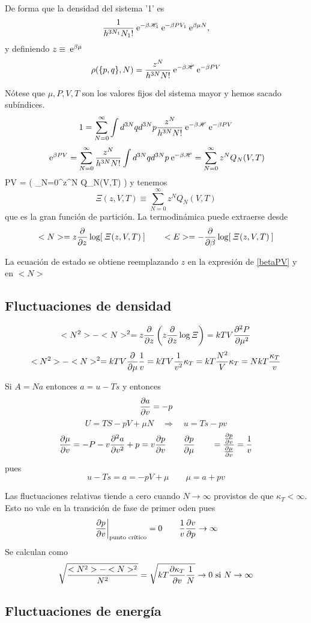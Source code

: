 \documentclass[10pt,oneside]{CBFT_book}
\begin{document}
De forma que la densidad del sistema '1' es
\[
	\frac{1}{h^{3N_1}N_1!} \euler^{-\beta\Ham_1}  \euler^{-\beta PV_1}  \euler^{\beta \mu N},
\]
y definiendo $z \equiv \euler^{\beta\mu}$
\[
	\rho(\{p,q\},N) = \frac{z^N}{h^{3N}N!} \euler^{-\beta\Ham}  \euler^{-\beta PV} 
\]

Nótese que $ \mu, P, V, T$  son los valores fijos del sistema mayor y hemos sacado subíndices.
\[
	1 = \sum_{N=0}^\infty \int d^{3N}q d^{3N}p \frac{z^N}{h^{3N}N!} \euler^{-\beta\Ham}  \euler^{-\beta PV} 
\]
\[
	\euler^{\beta PV} = \sum_{N=0}^\infty \frac{z^N}{h^{3N}N!} \int d^{3N}q d^{3N}p \euler^{-\beta\Ham}
	= \sum_{N=0}^\infty z^N Q_N(V,T)
\]
\be
	\beta PV = \log \left( \sum_{N=0}^\infty z^N Q_N(V,T) \right)
	\label{betaPV}
\ee
y tenemos 
\[
	\Xi(z,V,T) \equiv \sum_{N=0}^\infty z^N Q_N(V,T)
\]
que es la gran función de partición.
La termodinámica puede extraerse desde 
\[
	<N> = z\dpar{}{z} \log [ \:\Xi(z,V,T) \:]     \qquad 
	<E> = -\dpar{}{\beta} \log [ \:\Xi(z,V,T)\: ]
\]

La ecuación de estado se obtiene reemplazando $z$ en la expresión de \eqref{betaPV} y en $<N>$


\subsection{Fluctuaciones de densidad}

\[
	<N^2> - <N>^2 =  z\dpar{}{z}\left( z\dpar{}{z} \log \Xi \right)= kTV \dpar[2]{P}{\mu}
\]
\[
	<N^2> - <N>^2 = kTV \dpar{}{\mu}\frac{1}{v} = kTV \frac{1}{v^2}\kappa_T = kT\frac{N^2}{V}\kappa_T 
	= NkT \frac{\kappa_T}{v}
\]

Si $A=Na$ entonces $a=u-Ts$ y entonces 
\[
	\dpar{a}{v} = -p
\]
\[
	U = TS-pV+\mu N \quad \Rightarrow \quad u = Ts - pv
\]
\[
	\dpar{\mu}{v} = -P -v\dpar[2]{a}{v} + p = v \dpar{p}{v} \qquad \dpar{p}{\mu} \qquad 
			= \frac{\dpar{p}{v}}{\dpar{\mu}{v}}=\frac{1}{v}
\]
pues 
\[
	u - Ts = a = - pV + \mu \qquad \mu = a + pv
\]

Las fluctuaciones relativas tiende a cero cuando $N\to\infty$ provistos de que $\kappa_T < \infty$. Esto no vale 
en la transición de fase de primer oden pues 
\[
	\left. \dpar{p}{v} \right|_{\text{punto crítico}} = 0 \qquad \frac{1}{v} \dpar{v}{p} \to \infty
\]
Se calculan como 
\[
	\sqrt{\frac{<N^2> - <N>^2}{N^2}} = \sqrt{ kT\dpar{\kappa_T}{v}\frac{1}{N}} \to 0 \text{ si } N\to\infty
\]

\subsection{Fluctuaciones de energía}
\end{document}
